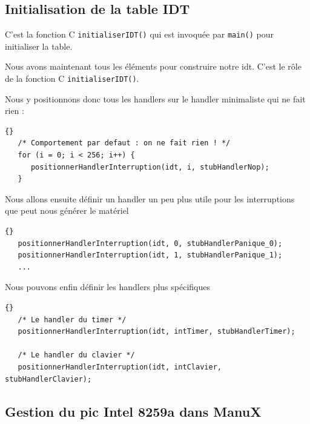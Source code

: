 \subsection{Initialisation de la table IDT}

   C'est la fonction C \lstinline!initialiserIDT()! qui est invoquée
par \lstinline!main()! pour initialiser la table.
   
   Nous avons maintenant tous les éléments pour construire notre {\sc
idt}. C'est le rôle de la fonction C \lstinline!initialiserIDT()!.
   
   Nous y positionnons donc tous les handlers sur le handler minimaliste
qui ne fait rien :

\begin{lstlisting}{}
   /* Comportement par defaut : on ne fait rien ! */
   for (i = 0; i < 256; i++) {
      positionnerHandlerInterruption(idt, i, stubHandlerNop);
   }
\end{lstlisting}

   Nous allons ensuite définir un handler un peu plus utile pour les
interruptions que peut nous générer le matériel

\begin{lstlisting}{}
   positionnerHandlerInterruption(idt, 0, stubHandlerPanique_0);
   positionnerHandlerInterruption(idt, 1, stubHandlerPanique_1);
   ...
\end{lstlisting}
   
   Nous pouvons enfin définir les handlers plus spécifiques

\begin{lstlisting}{}
   /* Le handler du timer */
   positionnerHandlerInterruption(idt, intTimer, stubHandlerTimer);

   /* Le handler du clavier */
   positionnerHandlerInterruption(idt, intClavier, stubHandlerClavier);
\end{lstlisting}

%
\subsection{Gestion du {\sc pic} Intel 8259a dans ManuX}

